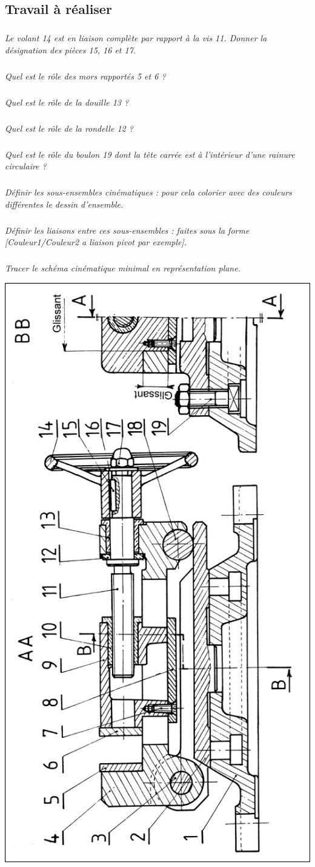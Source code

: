 \documentclass[10pt,fleqn]{article} %
\begin{document}
\begin{multicols}{2}
\subsection*{Travail à réaliser}

\subparagraph{}\textit{Le volant 14 est en liaison complète par rapport à la vis 11. Donner la désignation des pièces 15, 16 et
17.}
\subparagraph{}\textit{Quel est le rôle des mors rapportés 5 et 6 ?}
\subparagraph{}\textit{Quel est le rôle de la douille 13 ?}
\subparagraph{}\textit{Quel est le rôle de la rondelle 12 ?}
\subparagraph{}\textit{Quel est le rôle du boulon 19 dont la tête carrée est à l’intérieur d’une rainure circulaire ?}
\subparagraph{}\textit{Définir les sous-ensembles cinématiques : pour cela colorier avec des couleurs différentes le dessin
d’ensemble.}
\subparagraph{}\textit{Définir les liaisons entre ces sous-ensembles : faites sous la forme [Couleur1/Couleur2 a liaison pivot
par exemple].}
\subparagraph{}\textit{Tracer le schéma cinématique minimal en représentation plane.}
\end{multicols}


\begin{center}
\includegraphics[height=\textheight]{images/plan}
\end{center}
\end{document}
